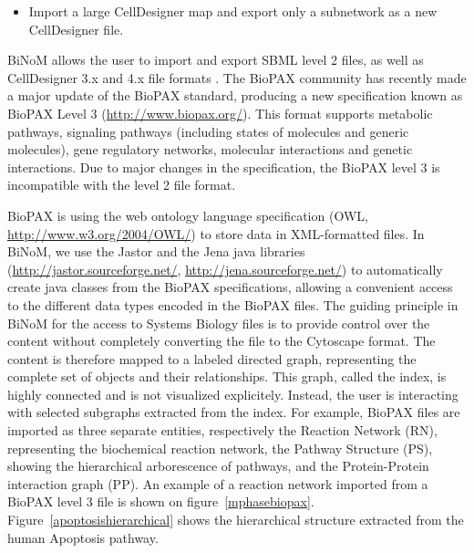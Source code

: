 \documentclass[10pt]{bmc_article}
\newenvironment{bmcformat}{\baselineskip20pt\sloppy\setboolean{publ}{false}}{\baselineskip20pt\sloppy}
\begin{document}
\begin{bmcformat}
\begin{itemize}
\item Import a large CellDesigner map and export only a subnetwork as a new CellDesigner file.  

\end{itemize}

BiNoM allows the user to import and export SBML level 2 files, as well as
CellDesigner 3.x and 4.x file formats \cite{zinovyev2008binom}. The BioPAX
community has recently made a major update of the BioPAX standard, producing a
new specification known as BioPAX Level 3 (\url{http://www.biopax.org/}). This
format supports metabolic pathways, signaling pathways (including states of molecules
and generic molecules), gene regulatory networks, molecular interactions and
genetic interactions. Due to major changes in the
specification, the BioPAX level 3 is incompatible with the level 2 file format.

BioPAX is using the web ontology language specification (OWL,
\url{http://www.w3.org/2004/OWL/}) to store data in XML-formatted files. In
BiNoM, we use the Jastor and the Jena java libraries
(\url{http://jastor.sourceforge.net/}, \url{http://jena.sourceforge.net/}) to
automatically create java classes from the BioPAX specifications, allowing a
convenient access to the different data types encoded in the BioPAX files. The
guiding principle in BiNoM for the
access to Systems Biology files is to provide control over the content without
completely converting the file to the Cytoscape format. The content is therefore
mapped to a labeled directed graph, representing the complete set of objects and
their relationships. This graph, called the index, is highly connected and is
not visualized explicitely. Instead, the user is interacting with selected subgraphs
extracted from the index. For example, BioPAX files are imported as three
separate entities, respectively the Reaction Network (RN), representing the
biochemical reaction network, the Pathway Structure (PS), showing the
hierarchical arborescence of pathways, and the Protein-Protein interaction graph
(PP). An example of a reaction network imported from a BioPAX level 3 file is
shown on figure~\ref{mphasebiopax}. Figure~\ref{apoptosishierarchical}
shows the hierarchical structure extracted from the human Apoptosis pathway.  



\end{bmcformat}
\end{document}
